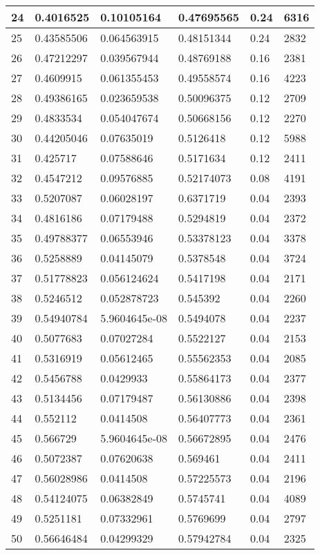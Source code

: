 \begin{longtable}{|l|l|l|l|l|l|}
24 & 0.4016525 & 0.10105164 & 0.47695565 & 0.24 & 6316 \\ \hline 
25 & 0.43585506 & 0.064563915 & 0.48151344 & 0.24 & 2832 \\ \hline 
26 & 0.47212297 & 0.039567944 & 0.48769188 & 0.16 & 2381 \\ \hline 
27 & 0.4609915 & 0.061355453 & 0.49558574 & 0.16 & 4223 \\ \hline 
28 & 0.49386165 & 0.023659538 & 0.50096375 & 0.12 & 2709 \\ \hline 
29 & 0.4833534 & 0.054047674 & 0.50668156 & 0.12 & 2270 \\ \hline 
30 & 0.44205046 & 0.07635019 & 0.5126418 & 0.12 & 5988 \\ \hline 
31 & 0.425717 & 0.07588646 & 0.5171634 & 0.12 & 2411 \\ \hline 
32 & 0.4547212 & 0.09576885 & 0.52174073 & 0.08 & 4191 \\ \hline 
33 & 0.5207087 & 0.06028197 & 0.6371719 & 0.04 & 2393 \\ \hline 
34 & 0.4816186 & 0.07179488 & 0.5294819 & 0.04 & 2372 \\ \hline 
35 & 0.49788377 & 0.06553946 & 0.53378123 & 0.04 & 3378 \\ \hline 
36 & 0.5258889 & 0.04145079 & 0.5378548 & 0.04 & 3724 \\ \hline 
37 & 0.51778823 & 0.056124624 & 0.5417198 & 0.04 & 2171 \\ \hline 
38 & 0.5246512 & 0.052878723 & 0.545392 & 0.04 & 2260 \\ \hline 
39 & 0.54940784 & 5.9604645e-08 & 0.5494078 & 0.04 & 2237 \\ \hline 
40 & 0.5077683 & 0.07027284 & 0.5522127 & 0.04 & 2153 \\ \hline 
41 & 0.5316919 & 0.05612465 & 0.55562353 & 0.04 & 2085 \\ \hline 
42 & 0.5456788 & 0.0429933 & 0.55864173 & 0.04 & 2377 \\ \hline 
43 & 0.5134456 & 0.07179487 & 0.56130886 & 0.04 & 2398 \\ \hline 
44 & 0.552112 & 0.0414508 & 0.56407773 & 0.04 & 2361 \\ \hline 
45 & 0.566729 & 5.9604645e-08 & 0.56672895 & 0.04 & 2476 \\ \hline 
46 & 0.5072387 & 0.07620638 & 0.569461 & 0.04 & 2411 \\ \hline 
47 & 0.56028986 & 0.0414508 & 0.57225573 & 0.04 & 2196 \\ \hline 
48 & 0.54124075 & 0.06382849 & 0.5745741 & 0.04 & 4089 \\ \hline 
49 & 0.5251181 & 0.07332961 & 0.5769699 & 0.04 & 2797 \\ \hline 
50 & 0.56646484 & 0.04299329 & 0.57942784 & 0.04 & 2325 \\ \hline 
\end{longtable}